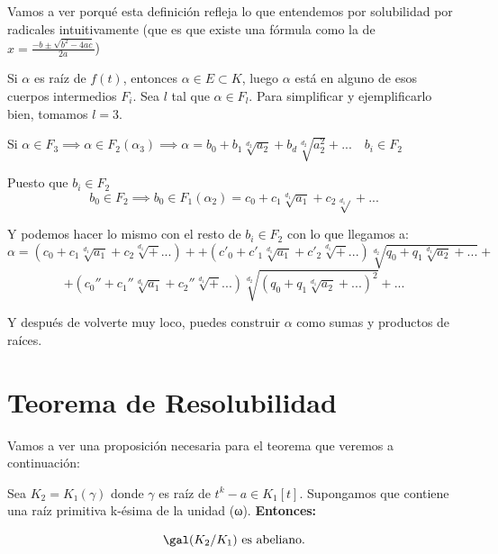 \documentclass{apuntes}
\begin{document}
Vamos a ver porqué esta definición refleja lo que entendemos por solubilidad por radicales intuitivamente (que es que existe una fórmula como la de $x=\frac{-b\pm\sqrt{ b^2-4ac}}{2a}$)

Si $α$ es raíz de $f(t)$, entonces $α∈E\subset K$, luego $α$ está en alguno de esos cuerpos intermedios $F_i$. Sea $l$ tal que $α∈F_l$. Para simplificar y ejemplificarlo bien, tomamos $l = 3$.

Si $α \in F_3 \implies α∈F_2(α_3)  \implies α = b_0 + b_1\sqrt[d_2]{a_2} + b_d\sqrt[d_2]{a_2^2} + ...\quad b_i∈F_2$

Puesto que $b_i \in F_2$
\[b_0 \in F_2 \implies b_0 \in F_1(α_2)= c_0 + c_1 \sqrt[d_1]{a_1} + c_2\sqrt[d_1]{} + ...\]

Y podemos hacer lo mismo con el resto de $b_i \in F_2$ con lo que llegamos a:
\[α = (c_0 + c_1 \sqrt[d_1]{a_1} + c_2\sqrt[d_1] + ...) + + (c'_0 + c'_1 \sqrt[d_1]{a_1} + c'_2\sqrt[d_1] + ...)\sqrt[d_2]{q_0 + q_1\sqrt[d_1]{a_2} + ...}+ \]
\[ + (c_0'' + c_1'' \sqrt[d_1]{a_1} + c_2''\sqrt[d_1] + ...) \sqrt[d_2]{(q_0 + q_1\sqrt[d_1]{a_2} + ...)^2}  + ...\]

Y después de volverte muy loco, puedes construir $α$ como sumas y productos de raíces.

\section{Teorema de Resolubilidad}
Vamos a ver una proposición necesaria para el teorema que veremos a continuación:

\begin{prop}
Sea $K_2 = K₁(γ)$ donde $γ$ es raíz de $t^k - a ∈K_1[t]$. Supongamos que contiene una raíz primitiva k-ésima de la unidad (ω). \textbf{Entonces: }

$$\gal(K_2/K_1) \text{ es abeliano.}$$
\end{prop}
\end{document}
